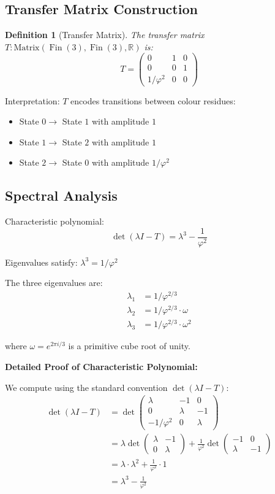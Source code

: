 \documentclass[11pt]{article}
\numberwithin{equation}{section}
\newtheorem{definition}[theorem]{Definition}
\theoremstyle{remark}
\newcommand{\R}{\mathbb{R}}
\DeclareMathOperator{\Fin}{Fin}
\begin{document}
\subsection{Transfer Matrix Construction}

\begin{definition}[Transfer Matrix]
The transfer matrix $T : \text{Matrix}(\Fin(3), \Fin(3), \R)$ is:
\[T = \begin{pmatrix}
0 & 1 & 0\\
0 & 0 & 1\\
1/\varphi^2 & 0 & 0
\end{pmatrix}\]
\end{definition}

Interpretation: $T$ encodes transitions between colour residues:
\begin{itemize}
\item State $0 \to$ State $1$ with amplitude $1$
\item State $1 \to$ State $2$ with amplitude $1$  
\item State $2 \to$ State $0$ with amplitude $1/\varphi^2$
\end{itemize}

\subsection{Spectral Analysis}

Characteristic polynomial:
\[\det(\lambda I - T) = \lambda^3 - \frac{1}{\varphi^2}\]

Eigenvalues satisfy: $\lambda^3 = 1/\varphi^2$

The three eigenvalues are:
\begin{align}
\lambda_1 &= 1/\varphi^{2/3}\\
\lambda_2 &= 1/\varphi^{2/3} \cdot \omega\\
\lambda_3 &= 1/\varphi^{2/3} \cdot \omega^2
\end{align}

where $\omega = e^{2\pi i/3}$ is a primitive cube root of unity.

\textbf{Detailed Proof of Characteristic Polynomial:}

We compute using the standard convention $\det(\lambda I - T)$:
\begin{align}
\det(\lambda I - T) &= \det\begin{pmatrix}
\lambda & -1 & 0\\
0 & \lambda & -1\\
-1/\varphi^2 & 0 & \lambda
\end{pmatrix}\\
&= \lambda \det\begin{pmatrix}
\lambda & -1\\
0 & \lambda
\end{pmatrix} + \frac{1}{\varphi^2} \det\begin{pmatrix}
-1 & 0\\
\lambda & -1
\end{pmatrix}\\
&= \lambda \cdot \lambda^2 + \frac{1}{\varphi^2} \cdot 1\\
&= \lambda^3 - \frac{1}{\varphi^2}
\end{align}
\end{document}
